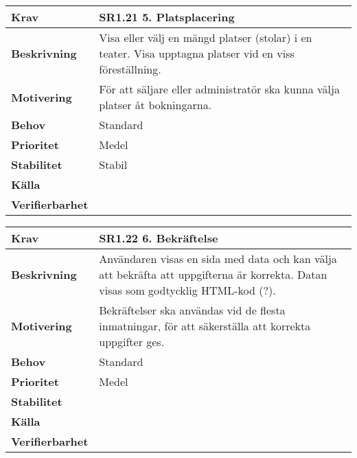 \documentclass[a4paper, twoside, 11pt, titlepage]{article}
\begin{document}
	\begin{tabular} { p{2.6cm} p{12.5cm} }
		\hline
		\sffamily\textbf{Krav} & \sffamily\textbf{SR1.21 5. Platsplacering } \\
		\hline
		\sffamily\textbf{Beskrivning} & Visa eller välj en mängd platser (stolar) i en teater. Visa upptagna platser vid en viss föreställning.  \\
		\hline
		\sffamily\textbf{Motivering} & För att säljare eller administratör ska kunna välja platser åt bokningarna.  \\
		\hline
		\sffamily\textbf{Behov} & Standard  \\
		\hline
		\sffamily\textbf{Prioritet} & Medel  \\
		\hline
		\sffamily\textbf{Stabilitet} & Stabil  \\
		\hline
		\sffamily\textbf{Källa} &   \\
		\hline
		\sffamily\textbf{Verifierbarhet} &   \\
		\hline
	\end{tabular}
	\vspace{6mm}

	\begin{tabular} { p{2.6cm} p{12.5cm} }
		\hline
		\sffamily\textbf{Krav} & \sffamily\textbf{SR1.22 6. Bekräftelse } \\
		\hline
		\sffamily\textbf{Beskrivning} & Användaren visas en sida med data och kan välja att bekräfta att uppgifterna är korrekta. Datan visas som godtycklig HTML-kod (?).  \\
		\hline
		\sffamily\textbf{Motivering} & Bekräftelser ska användas vid de flesta inmatningar, för att säkerställa att korrekta uppgifter ges.  \\
		\hline
		\sffamily\textbf{Behov} & Standard  \\
		\hline
		\sffamily\textbf{Prioritet} & Medel  \\
		\hline
		\sffamily\textbf{Stabilitet} &   \\
		\hline
		\sffamily\textbf{Källa} &   \\
		\hline
		\sffamily\textbf{Verifierbarhet} &   \\
		\hline
	\end{tabular}
	\vspace{6mm}
\end{document}

